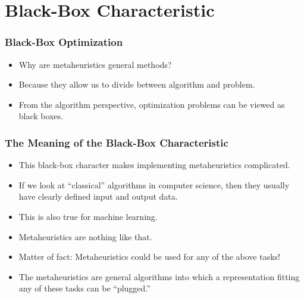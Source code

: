 \documentclass[mathserif]{beamer}%
\begin{document}
\section{Black-Box Characteristic}%
%
\begin{frame}[t]%
\frametitle{Black-Box Optimization}%
\begin{itemize}%
\item Why are metaheuristics \alert<1>{general} methods?%
\item<2-> Because they allow us to divide between \alert<2>{algorithm} and \alert<2>{problem}.%
\item<3-> From the algorithm perspective, optimization problems can be viewed as \alert<3>{black boxes}.%
\end{itemize}%
%
\vspace{0.34\paperheight}%
%
\end{frame}%
%
\begin{frame}%
\frametitle{The Meaning of the Black-Box Characteristic}%
\begin{itemize}%
\item This black-box character makes implementing metaheuristics complicated.%
\item<2-> If we look at ``classical'' algorithms in computer science, then they usually have clearly defined input and output data.%
\item<4-> This is also true for machine learning.%
\item<7-> Metaheuristics are nothing like that.%
\item<8-> Matter of fact: Metaheuristics could be used for \alert{any} of the above tasks!%
\item<9-> The metaheuristics are general algorithms into which a representation fitting any of these tasks can be ``plugged.''%
\end{itemize}%
\end{frame}%
\end{document}
